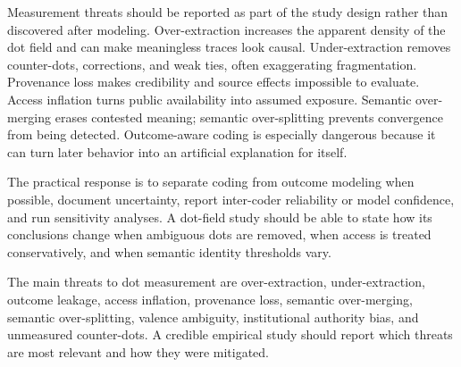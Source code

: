\documentclass[11pt]{article}
\theoremstyle{remark}
\begin{document}
Measurement threats should be reported as part of the study design rather than discovered after modeling. Over-extraction increases the apparent density of the dot field and can make meaningless traces look causal. Under-extraction removes counter-dots, corrections, and weak ties, often exaggerating fragmentation. Provenance loss makes credibility and source effects impossible to evaluate. Access inflation turns public availability into assumed exposure. Semantic over-merging erases contested meaning; semantic over-splitting prevents convergence from being detected. Outcome-aware coding is especially dangerous because it can turn later behavior into an artificial explanation for itself.

The practical response is to separate coding from outcome modeling when possible, document uncertainty, report inter-coder reliability or model confidence, and run sensitivity analyses. A dot-field study should be able to state how its conclusions change when ambiguous dots are removed, when access is treated conservatively, and when semantic identity thresholds vary.


The main threats to dot measurement are over-extraction, under-extraction,
outcome leakage, access inflation, provenance loss, semantic over-merging,
semantic over-splitting, valence ambiguity, institutional authority bias,
and unmeasured counter-dots. A credible empirical study should report
which threats are most relevant and how they were mitigated.
\end{document}
